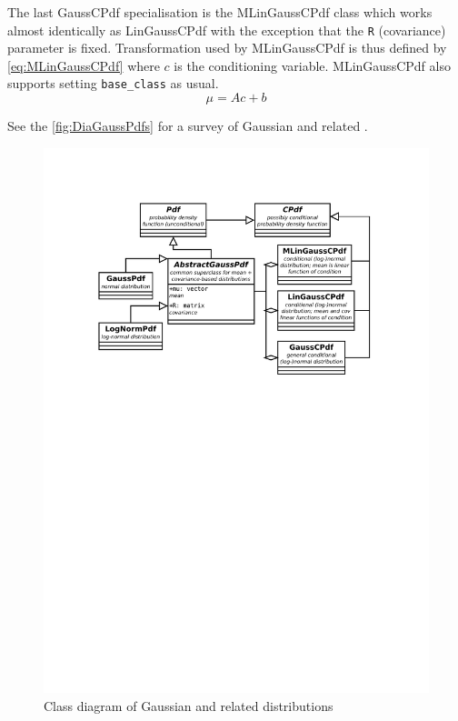 The last GaussCPdf specialisation is the MLinGaussCPdf class which works almost identically as
LinGaussCPdf with the exception that the \verb|R| (covariance) parameter is fixed. Transformation
used by MLinGaussCPdf is thus defined by \eqref{eq:MLinGaussCPdf} where \(c\) is the conditioning
variable. MLinGaussCPdf also supports setting \verb|base_class| as usual.
\begin{equation} \label{eq:MLinGaussCPdf}
	\mu = A c + b
\end{equation}

See the \autoref{fig:DiaGaussPdfs} for a survey of Gaussian and related {\pdfs}.

\begin{figure}[h]
	\centering
	\includegraphics[width=\textwidth,keepaspectratio=true,clip=true,trim=3cm 173mm 3cm 3cm]{./diagrams/gaussian_pdfs.pdf}
	\vspace{-8mm}
	\caption{Class diagram of Gaussian and related distributions}
	\label{fig:DiaGaussPdfs}
\end{figure}

